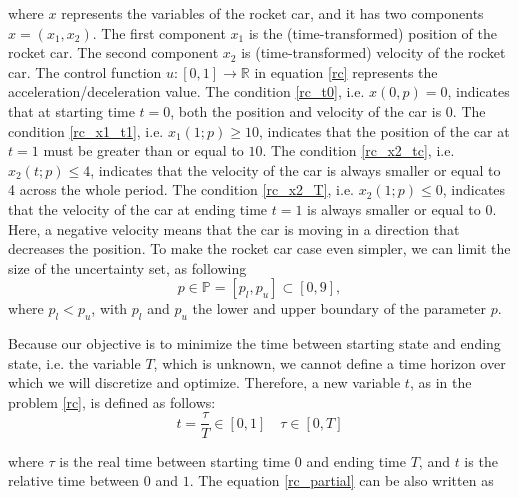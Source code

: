 \documentclass  [
  paper    = a4,
  BCOR     = 10mm,
  twoside,
  fontsize = 12pt,
  fleqn,
  toc      = bibnumbered,
  toc      = listofnumbered,
  numbers  = noendperiod,
  headings = normal,
  listof   = leveldown,
  version  = 3.03
]                                       {scrreprt}
\newcommand{\<}{\langle}
\renewcommand{\>}{\rangle}
\begin{document}
where $x$ represents the variables of the rocket car, and it has two components $ x = (x_1, x_2)$. The first component $x_1$ is the (time-transformed) position of the rocket car. The second component $x_2$ is (time-transformed) velocity of the rocket car. The control function $ u: [0,1] \rightarrow \mathbb{R}$ in equation \ref{rc} represents the acceleration/deceleration value. The condition \ref{rc_t0}, i.e. $x(0,p) = 0$, indicates that at starting time $t=0$, both the position and velocity of the car is $0$. The condition \ref{rc_x1_t1}, i.e. $x_1(1;p) \geq 10$, indicates that the position of the car at $t=1$ must be greater than or equal to $10$. The condition \ref{rc_x2_tc}, i.e. $x_2(t;p) \leq 4$, indicates that the velocity of the car is always smaller or equal to 4 across the whole period. The condition \ref{rc_x2_T}, i.e. $x_2(1;p) \leq 0$, indicates that the velocity of the car at ending time $t=1$ is always smaller or equal to $0$.  Here, a negative velocity means that the car is moving in a direction that decreases the position.  To make the rocket car case even simpler, we can limit the size of the uncertainty set, as following
\begin{equation}
	p \in \mathbb{P} = [p_l, p_u] \subset [0,9],
\end{equation}
where $p_l < p_u$, with $p_l$ and $p_u$ the lower and upper boundary of the parameter $p$. 


Because our objective is to minimize the time between starting state and ending state, i.e. the variable $T$, which is unknown, we cannot define a time horizon over which we will discretize and optimize. Therefore, a new variable $t$, as in the problem \ref{rc}, is defined as follows: 
\begin{equation}
	t= \frac{\tau}{T} \in [0,1] \quad \tau \in [0, T]
	\label{eqn:timet}
\end{equation}

where $\tau$ is the real time between starting time $0$ and ending time $T$, and $t$ is the relative time between $0$ and $1$.  The equation \ref{rc_partial} can be also written as 
\end{document}
